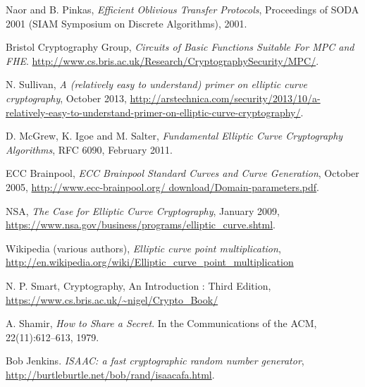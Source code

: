 \documentclass[ %
                    author={Nicholas Tutte},
                supervisor={Prof. Nigel Smart},
                    degree={MEng},
                     title={Secure Two Party Computation},
                  subtitle={A practical comparison of recent protocols},
                      type={Research - GG1K},
                      year={2015} ]{dissertation}
\begin{document}
\begin{thebibliography}{99}
			Naor and B. Pinkas, \emph{Efficient Oblivious Transfer Protocols}, Proceedings of SODA 2001 (SIAM Symposium on Discrete Algorithms), 2001.

			Bristol Cryptography Group,
			\emph{Circuits of Basic Functions Suitable For MPC and FHE}.  \url{http://www.cs.bris.ac.uk/Research/CryptographySecurity/MPC/}. 

			N. Sullivan,
			\emph{A (relatively easy to understand) primer on elliptic curve cryptography},
			October 2013,
			\url{http://arstechnica.com/security/2013/10/a-relatively-easy-to-understand-primer-on-elliptic-curve-cryptography/}.

			D. McGrew, K. Igoe and M. Salter,
			\emph{Fundamental Elliptic Curve Cryptography Algorithms},
			RFC 6090,
			February 2011.

			ECC Brainpool, \emph{ECC Brainpool Standard Curves and Curve Generation},
			October 2005, \url{http://www.ecc-brainpool.org/
			download/Domain-parameters.pdf}.

			NSA,
			\emph{The Case for Elliptic Curve Cryptography},
			January 2009,
			\url{https://www.nsa.gov/business/programs/elliptic_curve.shtml}.

			Wikipedia (various authors),
			\emph{Elliptic curve point multiplication},
			\url{http://en.wikipedia.org/wiki/Elliptic_curve_point_multiplication}

			N. P. Smart,
			Cryptography, An Introduction : Third Edition,
			\url{https://www.cs.bris.ac.uk/~nigel/Crypto_Book/}
		
			A. Shamir,
			\emph{How to Share a Secret}.
			In the Communications of the ACM,
			22(11):612–613,
			1979.

			Bob Jenkins. \emph{ISAAC: a fast cryptographic random number generator},
			\url{http://burtleburtle.net/bob/rand/isaacafa.html}.

	\end{thebibliography}
\end{document}
